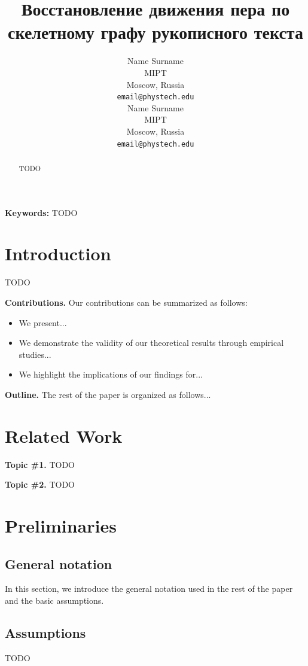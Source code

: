 \documentclass{article}
\title{Восстановление движения пера по скелетному графу рукописного текста}
\author{
  Name Surname\\
  MIPT\\
  Moscow, Russia\\
  \texttt{email@phystech.edu}\\
  \And
  Name Surname\\
  MIPT\\
  Moscow, Russia\\
  \texttt{email@phystech.edu}\\
}
\begin{document}
\maketitle

\begin{abstract}
    TODO
\end{abstract}

\textbf{Keywords:} TODO

\section{Introduction}\label{sec:intro}

TODO

\textbf{Contributions.} Our contributions can be summarized as follows:
\begin{itemize}
    \item We present...
    \item We demonstrate the validity of our theoretical results through empirical studies...
    \item We highlight the implications of our findings for...
\end{itemize}

\textbf{Outline.} The rest of the paper is organized as follows...

\section{Related Work}\label{sec:rw}

\textbf{Topic \#1.}
TODO

\textbf{Topic \#2.}
TODO

\section{Preliminaries}\label{sec:prelim}

\subsection{General notation}

In this section, we introduce the general notation used in the rest of the paper and the basic assumptions. 

\subsection{Assumptions} 

TODO
\end{document}
